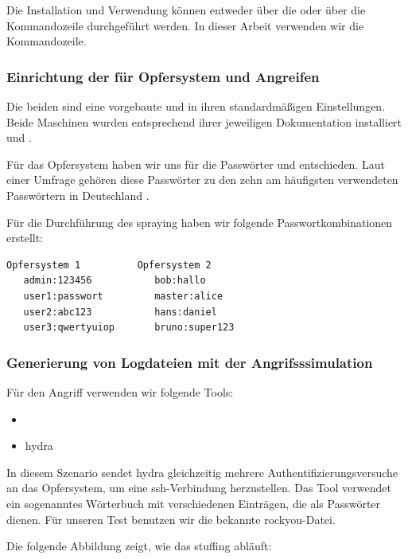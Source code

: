 Die Installation und Verwendung können entweder über die  oder über die Kommandozeile durchgeführt werden. In dieser Arbeit verwenden wir die Kommandozeile.

\subsubsection{Einrichtung der  für Opfersystem und Angreifen}
Die beiden  sind eine vorgebaute  und  in ihren standardmäßigen Einstellungen. Beide Maschinen wurden entsprechend ihrer jeweiligen Dokumentation installiert \citep{kali_vm} und \citep{Ubuntu_server}.

Für das Opfersystem haben wir uns für die Passwörter  und  entschieden. Laut einer Umfrage gehören diese Passwörter zu den zehn am häufigsten verwendeten Passwörtern in Deutschland \citep{silicon_passwort}.

Für die Durchführung des \gls{spraying} haben wir folgende Passwortkombinationen erstellt:

{
\begin{lstlisting}[frame=single]
   Opfersystem 1          Opfersystem 2  
   admin:123456           bob:hallo
   user1:passwort         master:alice
   user2:abc123           hans:daniel
   user3:qwertyuiop       bruno:super123
\end{lstlisting}
}

\newpage
\subsubsection{Generierung von Logdateien mit der Angrifsssimulation}
Für den Angriff verwenden wir folgende Tools:

{
\begin{itemize}[noitemsep]
   \item	{}
   \item \gls{hydra}
\end{itemize}
}

In diesem Szenario sendet \gls{hydra} gleichzeitig mehrere Authentifizierungsversuche an das Opfersystem, um eine \gls{ssh}-Verbindung herzustellen. Das Tool verwendet ein sogenanntes Wörterbuch mit verschiedenen Einträgen, die als Passwörter dienen. Für unseren Test benutzen wir die bekannte \gls{rockyou}-Datei.

Die folgende Abbildung zeigt, wie das \gls{stuffing} abläuft:


